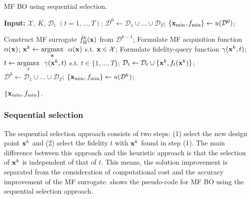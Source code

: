 \documentclass[journal ]{new-aiaa}
\begin{document}
\begin{algorithm}
	\caption{MF BO using sequential selection.}\label{Algo5}
	\begin{algorithmic}[1]
		\State \textbf{Input:} $\mathcal{X}$, $K$, $\mathcal{D}_t$ $(t=1,\dots,T)$;
		\State $\mathcal{D}^0 \gets \mathcal{D}_1 \cup \dots \cup \mathcal{D}_T$;
		\State $\{{\bf x}_{\min},f_{\min}\} \gets u(\mathcal{D}^0)$;
		
		\State Construct MF surrogate $\hat{f}_\text{H}^k({\bf x})$ from $\mathcal{D}^{k-1}$;
		\State Formulate MF acquisition function $\alpha({\bf x})$;
		\State ${\bf x}^{k} \gets \underset{{\bf x}}{\mathrm{argmax}} \ \ \alpha({\bf x})$ s.t. ${\bf x} \in \mathcal{X}$; \label{Algo5:7}
		\State Formulate fidelity-query function $\gamma({\bf x}^{k},t)$; \label{Algo5:8}
		\State $t \gets \underset{t}{\mathrm{argmax}} \ \ \gamma({\bf x}^{k},t)$ s.t. $t \in \{1,\dots,T\}$; \label{Algo5:9}
		\State $\mathcal{D}_t \gets \mathcal{D}_t \cup \{{\bf x}^{k},f_t({\bf x}^{k})\}$; \label{Algo5:10}
		\State $\mathcal{D}^k \gets \mathcal{D}_1 \cup \dots \cup \mathcal{D}_T$;
		\State $\{{\bf x}_{\min},f_{\min}\} \gets u(\mathcal{D}^k)$;
		\EndFor
		
		\State \Return $\{{\bf x}_{\min},f_{\min}\}$.
	\end{algorithmic}
\end{algorithm}

\subsubsection{Sequential selection}\label{Sec523}

The sequential selection approach consists of two steps: (1) select the new design point ${\bf x}^k$ and (2) select the fidelity $t$ with ${\bf x}^k$ found in step (1).
The main difference between this approach and the heuristic approach is that the selection of ${\bf x}^k$ is independent of that of $t$.
This means, the solution improvement is separated from the consideration of computational cost and the accuracy improvement of the MF surrogate.
 shows the pseudo-code for MF BO using the sequential selection approach.
\end{document}
